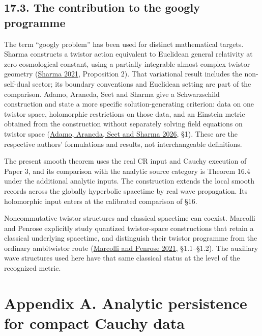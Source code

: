 \documentclass[
  english,
  11pt,
  reqno]{amsart}
\begin{document}
\protect{}\label{sec:googly-literature-scope}

\subsection{17.3. The contribution to the googly
programme}\label{the-contribution-to-the-googly-programme}

The term ``googly problem'' has been used for distinct mathematical
targets. Sharma constructs a twistor action equivalent to Euclidean
general relativity at zero cosmological constant, using a partially
integrable almost complex twistor geometry
(\hyperref[ref-Sharma2021]{Sharma 2021}, Proposition 2). That
variational result includes the non-self-dual sector; its boundary
conventions and Euclidean setting are part of the comparison. Adamo,
Araneda, Seet and Sharma give a Schwarzschild construction and state a
more specific solution-generating criterion: data on one twistor space,
holomorphic restrictions on those data, and an Einstein metric obtained
from the construction without separately solving field equations on
twistor space (\hyperref[ref-AdamoAranedaSeetSharma2026]{Adamo, Araneda,
Seet and Sharma 2026}, §1). These are the respective authors'
formulations and results, not interchangeable definitions.

The present smooth theorem uses the real CR input and Cauchy execution
of Paper 3, and its comparison with the analytic source category is
Theorem 16.4 under the additional analytic inputs. The construction
extends the local smooth records across the globally hyperbolic
spacetime by real wave propagation. Its holomorphic input enters at the
calibrated comparison of §16.

Noncommutative twistor structures and classical spacetime can coexist.
Marcolli and Penrose explicitly study quantized twistor-space
constructions that retain a classical underlying spacetime, and
distinguish their twistor programme from the ordinary ambitwistor route
(\hyperref[ref-MarcolliPenrose2021]{Marcolli and Penrose 2021},
§1.1--§1.2). The auxiliary wave structures used here have that same
classical status at the level of the recognized metric.

\protect{}\label{sec:compact-analytic-persistence}

\section{Appendix A. Analytic persistence for compact Cauchy
data}\label{appendix-a.-analytic-persistence-for-compact-cauchy-data}
\end{document}
